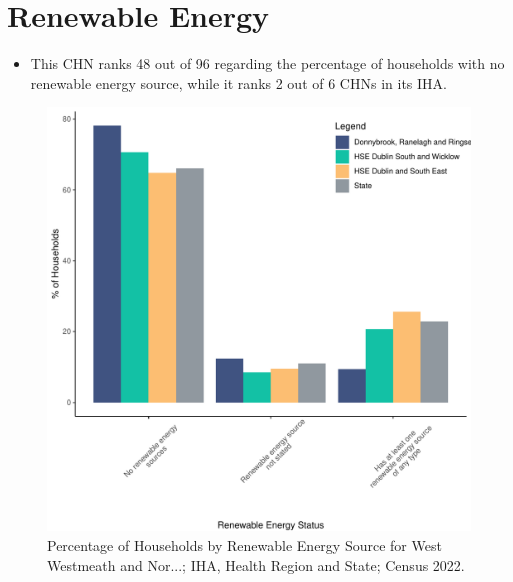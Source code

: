 \documentclass{article}
\begin{document}
\section{Renewable Energy}\label{sect:RE}
\begin{itemize}
\item This CHN ranks  48 out of 96 regarding the percentage of households with no renewable energy source, while it ranks   2 out of 6 CHNs in its IHA.
\end{itemize}
\begin{figure}[H]
	\centering
	\includegraphics[width = 140mm]{../figures/RenewableEnergyED.pdf}
	\caption{Percentage of Households by Renewable Energy Source for West Westmeath and Nor...; IHA, Health Region and State; Census 2022.}
	\label{fig:vbnv}
	\end{figure}
\end{document}
